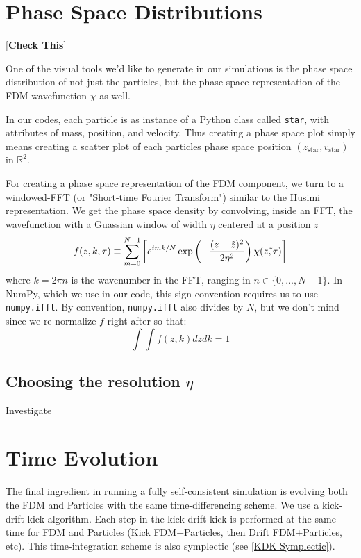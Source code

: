 \documentclass[oneside]{book}
\begin{document}
\section{Phase Space Distributions}

{\color{red}
[\textbf{Check This}]}

One of the visual tools we'd like to generate in our simulations is the phase space distribution of not just the particles, but the phase space representation of the FDM wavefunction $\chi$ as well.

In our codes, each particle is as instance of a Python class called \texttt{star}, with attributes of mass, position, and velocity. Thus creating a phase space plot simply means creating a scatter plot of each particles phase space position $(z_\text{star},v_\text{star})$ in $\mathbb{R}^2$.

For creating a phase space representation of the FDM component, we turn to a windowed-FFT (or "Short-time Fourier Transform") similar to the Husimi representation. We get the phase space density by convolving, inside an FFT, the wavefunction with a Guassian window of width $\eta$ centered at a position $z$
\begin{equation}
    f(z,k,\tau) \equiv \large{\sum_{m = 0}^{N-1}} \left[e^{imk/N}\exp\left({-\frac{(z-\tilde{z})^2}{2\eta^2}}\right)\chi(\tilde{z,\tau})\right]
    \label{PhaseSpace FDM}
\end{equation}
where $k = 2\pi n$ is the wavenumber in the FFT, ranging in $n\in\{0,...,N-1\}$. In NumPy, which we use in our code, this sign convention requires us to use \texttt{numpy.ifft}. By convention, \texttt{numpy.ifft} also divides by $N$, but we don't mind since we re-normalize $f$ right after so that:
\begin{equation}
\int\int f(z,k) dzdk = 1
\end{equation}

\subsection{Choosing the resolution $\eta$}\label{Choosing Resolution}
{\color{red}Investigate}


\section{Time Evolution}

The final ingredient in running a fully self-consistent simulation is evolving both the FDM and Particles with the same time-differencing scheme. We use a kick-drift-kick algorithm. Each step in the kick-drift-kick is performed at the same time for FDM and Particles (Kick FDM+Particles, then Drift FDM+Particles, etc). This time-integration scheme is also symplectic (see \cref{KDK Symplectic}).
\end{document}
